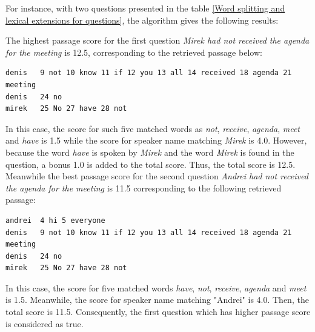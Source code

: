 For instance, with two questions presented in the table \ref{Word splitting and lexical extensions for questions}, the algorithm gives the following results: 

The highest passage score for the first question \textit{Mirek had not received the agenda for the meeting} is 12.5, corresponding to the retrieved passage below:
\scriptsize
\begin{verbatim}
denis   9 not 10 know 11 if 12 you 13 all 14 received 18 agenda 21 meeting
denis   24 no 
mirek   25 No 27 have 28 not
\end{verbatim}
\normalsize
 In this case, the score for such five matched words as \textit{not}, \textit{receive}, \textit{agenda}, \textit{meet} and \textit{have} is 1.5 while the score for speaker name matching \textit{Mirek} is 4.0. However, because the word \textit{have} is spoken by \textit{Mirek} and the word \textit{Mirek} is found in the question, a bonus 1.0 is added to the total score. Thus, the total score is 12.5. Meanwhile the best passage score for the second question \textit{Andrei had not received the agenda for the meeting} is 11.5 corresponding to the following retrieved passage:
\scriptsize
\begin{verbatim}
andrei  4 hi 5 everyone 
denis   9 not 10 know 11 if 12 you 13 all 14 received 18 agenda 21 meeting
denis   24 no 
mirek   25 No 27 have 28 not
\end{verbatim}
\normalsize
In this case, the score for five matched words \textit{have}, \textit{not}, \textit{receive}, \textit{agenda} and \textit{meet} is 1.5. Meanwhile, the score for speaker name matching "Andrei" is 4.0. Then, the total score is 11.5. Consequently, the first question which has higher passage score is considered as true.



